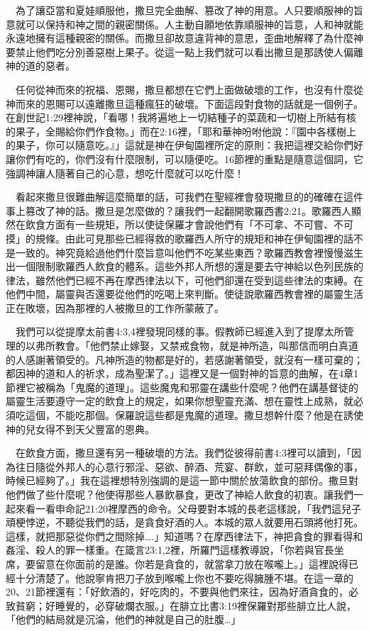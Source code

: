 \documentclass{book}
\begin{document}
　為了讓亞當和夏娃順服他，撒旦完全曲解、篡改了神的用意。人只要順服神的旨意就可以保持和神之間的親密關係。人主動自願地依靠順服神的旨意，人和神就能永遠地擁有這種親密的關係。而撒旦卻故意違背神的意思，歪曲地解釋了為什麼神要禁止他們吃分別善惡樹上果子。從這一點上我們就可以看出撒旦是那誘使人偏離神的道的惡者。

　任何從神而來的祝福、恩賜，撒旦都想在它們上面做破壞的工作，也沒有什麼從神而來的恩賜可以遠離撒旦這種瘋狂的破壞。下面這段對食物的話就是一個例子。在創世記1:29裡神說，「看哪！我將遍地上一切結種子的菜蔬和一切樹上所結有核的果子，全賜給你們作食物。」而在2:16裡，「耶和華神吩咐他說：『園中各樣樹上的果子，你可以隨意吃。』」這就是神在伊甸園裡所定的原則：我把這裡交給你們好讓你們有吃的，你們沒有什麼限制，可以隨便吃。16節裡的重點是隨意這個詞，它強調神讓人隨著自己的心意，想吃什麼就可以吃什麼！

　看起來撒旦很難曲解這麼簡單的話，可我們在聖經裡會發現撒旦的的確確在這件事上篡改了神的話。撒旦是怎麼做的？讓我們一起翻開歌羅西書2:21。歌羅西人顯然在飲食方面有一些規矩，所以使徒保羅才會說他們有「不可拿、不可嘗、不可摸」的規條。由此可見那些已經得救的歌羅西人所守的規矩和神在伊甸園裡的話不是一致的。神究竟給過他們什麼旨意叫他們不吃某些東西？歌羅西教會裡慢慢滋生出一個限制歌羅西人飲食的體系。這些外邦人所想的還是要去守神給以色列民族的律法，雖然他們已經不再在摩西律法以下，可他們卻還在受到這些律法的束縛。在他們中間，屬靈與否還要從他們的吃喝上來判斷。使徒說歌羅西教會裡的屬靈生活正在敗壞，因為那裡的人被撒旦的工作所蒙蔽了。

　我們可以從提摩太前書4:3,4裡發現同樣的事。假教師已經進入到了提摩太所管理的以弗所教會。「他們禁止嫁娶，又禁戒食物，就是神所造，叫那信而明白真道的人感謝著領受的。凡神所造的物都是好的，若感謝著領受，就沒有一樣可棄的；都因神的道和人的祈求，成為聖潔了。」這裡又是一個對神的旨意的曲解，在4章1節裡它被稱為「鬼魔的道理」。這些魔鬼和邪靈在講些什麼呢？他們在講基督徒的屬靈生活要遵守一定的飲食上的規定，如果你想聖靈充滿、想在靈性上成熟，就必須吃這個，不能吃那個。保羅說這些都是鬼魔的道理。撒旦想幹什麼？他是在誘使神的兒女得不到天父豐富的恩典。

　在飲食方面，撒旦還有另一種破壞的方法。我們從彼得前書4:3裡可以讀到，「因為往日隨從外邦人的心意行邪淫、惡欲、醉酒、荒宴、群飲，並可惡拜偶像的事，時候已經夠了。」我在這裡想特別強調的是這一節中關於放蕩飲食的部份。撒旦對他們做了些什麼呢？他使得那些人暴飲暴食，更改了神給人飲食的初衷。讓我們一起來看一看申命記21:20裡摩西的命令。父母要對本城的長老這樣說，「我們這兒子頑梗悖逆，不聽從我們的話，是貪食好酒的人。本城的眾人就要用石頭將他打死。這樣，就把那惡從你們之間除掉….」知道嗎？在摩西律法下，神把貪食的罪看得和姦淫、殺人的罪一樣重。在箴言23:1,2裡，所羅門這樣教導說，「你若與官長坐席，要留意在你面前的是誰。你若是貪食的，就當拿刀放在喉嚨上。」這裡說得已經十分清楚了。他說寧肯把刀子放到喉嚨上你也不要吃得臃腫不堪。在這一章的20、21節裡還有：「好飲酒的，好吃肉的，不要與他們來往，因為好酒貪食的，必致貧窮；好睡覺的，必穿破爛衣服。」在腓立比書3:19裡保羅對那些腓立比人說，「他們的結局就是沉淪，他們的神就是自己的肚腹…」
\end{document}
